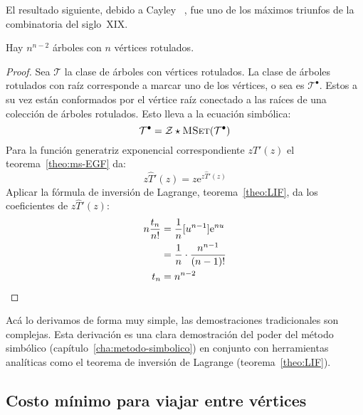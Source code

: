   El resultado siguiente,
  debido a Cayley~%
    \cite{cayley89:_theo_trees},
  fue uno de los máximos triunfos de la combinatoria del siglo~XIX.
  \begin{theorem}[Cayley]
    \label{theo:cayley}
    Hay \(n^{n - 2}\) árboles
    con \(n\) vértices rotulados.
  \end{theorem}
  \begin{proof}
    Sea \(\mathcal{T}\) la clase de árboles con vértices rotulados.%
    La clase de árboles rotulados con raíz
    corresponde a marcar uno de los vértices,
    o sea es \(\mathcal{T}^\bullet\).
    Estos a su vez están conformados por el vértice raíz
    conectado a las raíces de una colección de árboles rotulados.
    Esto lleva a la ecuación simbólica:
    \begin{equation*}
      \mathcal{T}^\bullet
	= \mathcal{Z} \star \operatorname{\textsc{MSet}}(\mathcal{T}^\bullet)
    \end{equation*}
    Para la función generatriz exponencial correspondiente%
    \(z \widehat{T}'(z)\)
    el teorema~\ref{theo:ms-EGF} da:
    \begin{equation*}
      z \widehat{T}'(z)
	= z \mathrm{e}^{z \widehat{T}'(z)}
    \end{equation*}
    Aplicar la fórmula de inversión de Lagrange,%
    teorema~\ref{theo:LIF},
    da los coeficientes de \(z \widehat{T}'(z)\):
    \begin{align*}
      n \frac{t_n}{n!}
	&= \frac{1}{n} [ u^{n - 1} ] \mathrm{e}^{n u} \\
	&= \frac{1}{n} \cdot \frac{n^{n - 1}}{(n - 1)!} \\
      t_n
	&= n^{n - 2}
    \qedhere
    \end{align*}
  \end{proof}
  Acá lo derivamos de forma muy simple,
  las demostraciones tradicionales son complejas.
  Esta derivación
  es una clara demostración del poder del método simbólico
  (capítulo~\ref{cha:metodo-simbolico})
  en conjunto con herramientas analíticas
  como el teorema de inversión de Lagrange
  (teorema~\ref{theo:LIF}).

\subsection{Costo mínimo para viajar entre vértices}
\label{sec:costo-minimo-entre-vertices}

